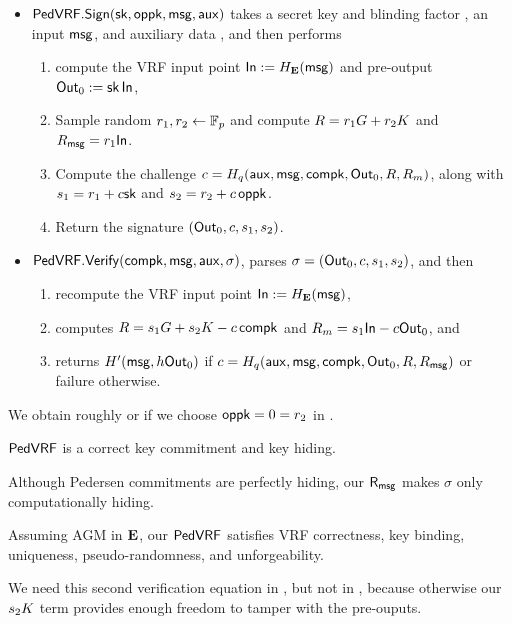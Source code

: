 \begin{itemize}
\item ${\mathsf{PedVRF}}.{\mathsf{Sign}}(\mathsf{sk},\mathsf{oppk},\mathsf{msg},\mathsf{aux})$ takes a secret key \sk and blinding factor \openpk, an input $\mathsf{msg}$, and auxiliary data \aux, and then performs
\begin{enumerate}
    \item compute the VRF input point ${\mathsf{In}} := H_{{\mathbf{E}}}(\mathsf{msg})$ and pre-output ${\mathsf{Out}}_0 := \mathsf{sk} \, {\mathsf{In}}$,
    \item Sample random $r_1,r_2 \leftarrow \mathbb{F}_p$ and compute $R = r_1 G + r_2 K$ and $R_\mathsf{msg} = r_1 {\mathsf{In}}$.
    \item Compute the challenge $c = H_q(\mathsf{aux},\mathsf{msg},\mathsf{compk},{\mathsf{Out}}_0,R,R_m)$,
     along with $s_1 = r_1 + c \mathsf{sk}$ and $s_2 = r_2 + c \, \mathsf{oppk}$.
    \item Return the signature $({\mathsf{Out}}_0,c,s_1,s_2)$.
\end{enumerate}
\item ${\mathsf{PedVRF}}.{\mathsf{Verify}}(\mathsf{compk},\mathsf{msg},\mathsf{aux},\sigma)$, parses $\sigma = ({\mathsf{Out}}_0,c,s_1,s_2)$, and then 
\begin{enumerate}
    \item recompute the VRF input point ${\mathsf{In}} := H_{{\mathbf{E}}}(\mathsf{msg})$,
    \item computes $R = s_1 G + s_2 K - c \, \mathsf{compk}$ and $R_m = s_1 {\mathsf{In}} - c {\mathsf{Out}}_0$, and
    \item returns $H'(\mathsf{msg}, h {\mathsf{Out}}_0)$ if $c = H_q(\mathsf{aux},\mathsf{msg},\mathsf{compk},{\mathsf{Out}}_0,R,R_\mathsf{msg})$ or failure otherwise.
\end{enumerate}
\end{itemize}

We obtain roughly \cite{nsec5} or \cite{VXEd25519}
if we choose $\mathsf{oppk} = 0 = r_2$ in \Sign.

\begin{lemma}\label{prop:pedersen_vrf_hiding}
${\mathsf{PedVRF}}$ is a correct key commitment and key hiding.
\end{lemma}

Although Pedersen commitments are perfectly hiding, our $\mathsf{R}_\mathsf{msg}$ makes $\sigma$ only computationally hiding.

\begin{proposition}\label{prop:pedersen_vrf}
Assuming AGM in ${\mathbf{E}}$, %
our ${\mathsf{PedVRF}}$ satisfies VRF correctness, key binding, uniqueness,
pseudo-randomness, and unforgeability. %
\end{proposition}

We need this second verification equation in \PedVRF, but not in \ThinVRF,
because otherwise our $s_2 K$ term provides enough freedom to tamper
with the pre-ouputs.  

